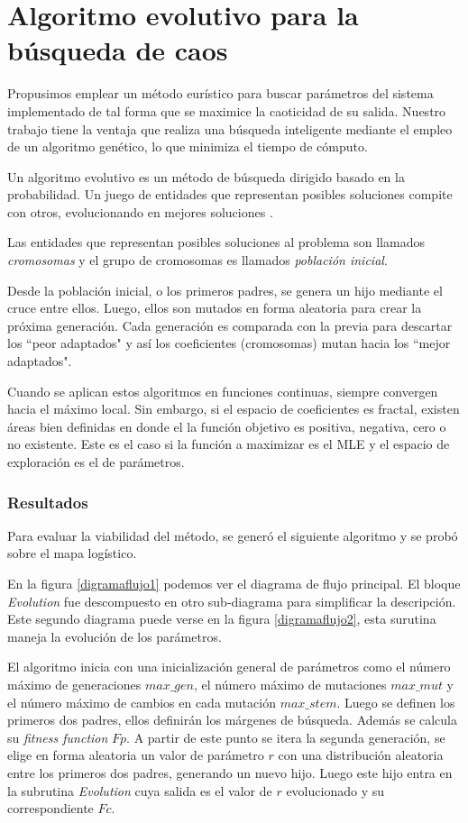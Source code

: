 \section{Algoritmo evolutivo para la búsqueda de caos}

Propusimos emplear un método eurístico para buscar parámetros del sistema implementado de tal forma que se maximice la caoticidad de su salida.
Nuestro trabajo tiene la ventaja que realiza una búsqueda inteligente mediante el empleo de un algoritmo genético, lo que minimiza el tiempo de cómputo.

Un algoritmo evolutivo es un método de búsqueda dirigido basado en la probabilidad.
Un juego de entidades que representan posibles soluciones compite con otros, evolucionando en mejores soluciones \cite{Weise2009}.

Las entidades que representan posibles soluciones al problema son llamados \textit{cromosomas} y el grupo de cromosomas es llamados \textit{población inicial}.

Desde la población inicial, o los primeros padres, se genera un hijo mediante el cruce entre ellos.
Luego, ellos son mutados en forma aleatoria para crear la próxima generación.
Cada generación es comparada con la previa para descartar los ``peor adaptados" y así los coeficientes (cromosomas) mutan hacia los ``mejor adaptados".

Cuando se aplican estos algoritmos en funciones continuas, siempre convergen hacia el máximo local.
Sin embargo, si el espacio de coeficientes es fractal, existen áreas bien definidas en donde el la función objetivo es positiva, negativa, cero o no existente.
Este es el caso si la función a maximizar es el MLE y el espacio de exploración es el de parámetros.

\subsubsection{Resultados}

Para evaluar la viabilidad del método, se generó el siguiente algoritmo y se probó sobre el mapa logístico.

En la figura \ref{digramaflujo1} podemos ver el diagrama de flujo principal.
El bloque \textit{Evolution} fue descompuesto en otro sub-diagrama para simplificar la descripción.
Este segundo diagrama puede verse en la figura \ref{digramaflujo2}, esta surutina maneja la evolución de los parámetros.

El algoritmo inicia con una inicialización general de parámetros como el número máximo de generaciones $max\_gen$, el número máximo de mutaciones $max\_mut$ y el número máximo de cambios en cada mutación $max\_stem$.
Luego se definen los primeros dos padres, ellos definirán los márgenes de búsqueda.
Además se calcula su \textit{fitness function} $Fp$.
A partir de este punto se itera la segunda generación, se elige en forma aleatoria un valor de parámetro $r$ con una distribución aleatoria entre los primeros dos padres, generando un nuevo hijo.
Luego este hijo entra en la subrutina \textit{Evolution} cuya salida es el valor de $r$ evolucionado y su correspondiente $Fc$.

